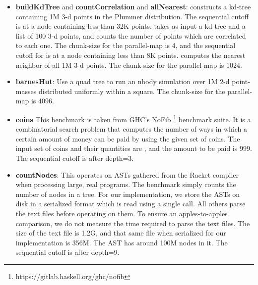 \documentclass[acmsmall,acmthm=false,nonacm]{acmart}
\theoremstyle{straighttext0}
\theoremstyle{straighttext}
\begin{document}
{\begin{itemize}
\item \textbf{buildKdTree} and \textbf{countCorrelation} and \textbf{allNearest}:
   constructs a kd-tree \cite{kdtree}
  containing 1M 3-d points
  in the Plummer distribution.
  The sequential cutoff is at a node containing less than 32K points.
   takes as input a kd-tree and a list of 100 3-d points,
  and counts the number of points which are correlated to each one.
  The chunk-size for the parallel-map is 4, and the sequential cutoff
  for  is at a node containing less than 8K points.
   computes the nearest neighbor of all 1M 3-d points.
  The chunk-size for the parallel-map is 1024.

  
\item \textbf{barnesHut}:
  Use a quad tree to run an nbody simulation over
  1M 2-d point-masses distributed uniformly within a square.
  The chunk-size for the parallel-map is 4096.

\item \textbf{coins}
  This benchmark is taken from GHC's NoFib \footnote{https://gitlab.haskell.org/ghc/nofib}
  benchmark suite. It is a combinatorial search problem that computes
  the number of ways in which a certain amount of money can be paid by
  using the given set of coins.
  The input set of coins and their quantities are
  \il{[(250,55),(100,88),(25,88),(10,99),(5,122),(1,177)]},
  and the amount to be paid is 999.
  The sequential cutoff is after depth=3.

\item \textbf{countNodes}: This operates on ASTs gathered from the Racket compiler when processing
  large, real programs. The benchmark simply counts the number of
  nodes in a tree.
  For our implementation, we store the ASTs on disk in a serialized format
  which is read using a single  call.
  All others parse the text files before operating on them.
  To ensure an apples-to-apples comparison, we do not measure the time required
  to parse the text files.
  The size of the text file is 1.2G, and that same file
  when serialized for our implementation is 356M.
  The AST has around 100M nodes in it.
  The sequential cutoff is after depth=9.


\end{itemize}}
\end{document}
